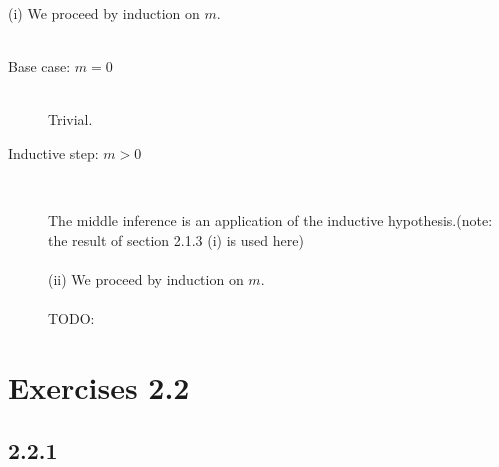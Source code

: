 \documentclass{article}
\begin{document}
(i) We proceed by induction on $m$.\\~\\
\begin{description}

\item[Base case: $m = 0$]~\\

Trivial.

\item[Inductive step: $m > 0$]~\\

\begin{prooftree}

\end{prooftree}

The middle inference is an application of the inductive hypothesis.(note: the result of section 2.1.3 (i) is used here) \\~\\
(ii) We proceed by induction on $m$.\\~\\
TODO:

\end{description}

\section*{Exercises 2.2}

\subsection*{2.2.1}
\end{document}
